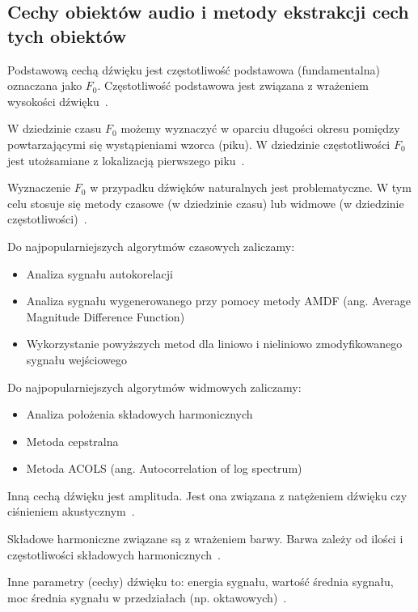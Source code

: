 \documentclass[wi]{zut}
\begin{document}
\subsection{Cechy obiektów audio i metody ekstrakcji cech tych obiektów}

Podstawową cechą dźwięku jest częstotliwość podstawowa (fundamentalna) oznaczana jako $F_0$. Częstotliwość podstawowa jest związana z wrażeniem wysokości dźwięku~\cite{Polrolniczak}.

W dziedzinie czasu $F_0$ możemy wyznaczyć w oparciu długości okresu pomiędzy powtarzającymi się wystąpieniami wzorca (piku). W dziedzinie częstotliwości $F_0$ jest utożsamiane z lokalizacją pierwszego piku~\cite{Polrolniczak}.

Wyznaczenie $F_0$ w przypadku dźwięków naturalnych jest problematyczne. W tym celu stosuje się metody czasowe (w dziedzinie czasu) lub widmowe (w dziedzinie częstotliwości)~\cite{Polrolniczak}.

Do najpopularniejszych algorytmów czasowych zaliczamy:

\begin{itemize}
    \item Analiza sygnału autokorelacji
    \item Analiza sygnału wygenerowanego przy pomocy metody AMDF (ang. Average Magnitude Difference Function)
    \item Wykorzystanie powyższych metod dla liniowo i nieliniowo zmodyfikowanego sygnału wejściowego
\end{itemize}

Do najpopularniejszych algorytmów widmowych zaliczamy:

\begin{itemize}
    \item Analiza położenia składowych harmonicznych
    \item Metoda cepstralna
    \item Metoda ACOLS (ang. Autocorrelation of log spectrum)
\end{itemize}

Inną cechą dźwięku jest amplituda. Jest ona związana z natężeniem dźwięku czy ciśnieniem akustycznym~\cite{Polrolniczak}.

Składowe harmoniczne związane są z wrażeniem barwy. Barwa zależy od ilości i częstotliwości składowych harmonicznych~\cite{Polrolniczak}.

Inne parametry (cechy) dźwięku to: energia sygnału, wartość średnia sygnału, moc średnia sygnału w przedziałach (np. oktawowych)~\cite{Polrolniczak}.
\end{document}

